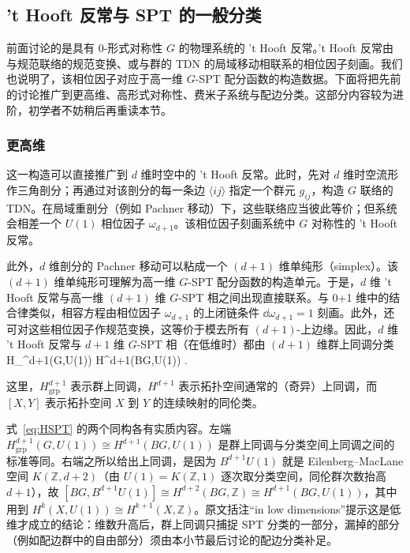 
\subsection{'t Hooft 反常与 SPT 的一般分类}\label{sec:gen-SPT}

前面讨论的是具有 0-形式对称性 $G$ 的物理系统的 't Hooft 反常。't Hooft 反常由与规范联络的规范变换、或与群的 TDN 的局域移动相联系的相位因子刻画。我们也说明了，该相位因子对应于高一维 $G$-SPT 配分函数的构造数据。下面将把先前的讨论推广到更高维、高形式对称性、费米子系统与配边分类。这部分内容较为进阶，初学者不妨稍后再重读本节。

\subsubsection{更高维}

这一构造可以直接推广到 $d$ 维时空中的 't Hooft 反常。此时，先对 $d$ 维时空流形作三角剖分；再通过对该剖分的每一条边 $\langle ij \rangle$ 指定一个群元 $g_{ij}$，构造 $G$ 联络的 TDN。在局域重剖分（例如 Pachner 移动）下，这些联络应当彼此等价；但系统会相差一个 $U(1)$ 相位因子 $\omega_{d+1}$。该相位因子刻画系统中 $G$ 对称性的 't Hooft 反常。

此外，$d$ 维剖分的 Pachner 移动可以粘成一个 $(d+1)$ 维单纯形（simplex）。该 $(d+1)$ 维单纯形可理解为高一维 $G$-SPT 配分函数的构造单元。于是，$d$ 维 't Hooft 反常与高一维 $(d+1)$ 维 $G$-SPT 相之间出现直接联系。与 0+1 维中的结合律类似，相容方程由相位因子 $\omega_{d+1}$ 的上闭链条件 $\dd \omega_{d+1}=1$ 刻画。此外，还可对这些相位因子作规范变换，这等价于模去所有 $(d+1)$-上边缘。因此，$d$ 维 't Hooft 反常与 $d+1$ 维 $G$-SPT 相（在低维时）都由 $(d+1)$ 维群上同调分类~\cite{chen2012symmetry,chen2013symmetry}
\be\label{eq:HSPT}
H_{}^{d+1}(G,U(1)) \cong H^{d+1}(BG,U(1)) \cong [BG,B^{d+1}U(1)].
\ee

这里，$H_{\mathrm{grp}}^{d+1}$ 表示群上同调，$H^{d+1}$ 表示拓扑空间通常的（奇异）上同调，而 $[X,Y]$ 表示拓扑空间 $X$ 到 $Y$ 的连续映射的同伦类。

\begin{yizhu}式~\eqref{eq:HSPT} 的两个同构各有实质内容。左端 $H^{d+1}_{\mathrm{grp}}(G,U(1))\cong H^{d+1}(BG,U(1))$ 是群上同调与分类空间上同调之间的标准等同。右端之所以给出上同调，是因为 $B^{d+1}U(1)$ 就是 Eilenberg--MacLane 空间 $K(\mathbb{Z},d+2)$（由 $U(1)=K(\mathbb{Z},1)$ 逐次取分类空间，同伦群次数抬高 $d+1$），故 $[BG,B^{d+1}U(1)]\cong H^{d+2}(BG,\mathbb{Z})\cong H^{d+1}(BG,U(1))$，其中用到 $H^{k}(X,U(1))\cong H^{k+1}(X,\mathbb{Z})$。原文括注“in low dimensions”提示这是低维才成立的结论：维数升高后，群上同调只捕捉 SPT 分类的一部分，漏掉的部分（例如配边群中的自由部分）须由本小节最后讨论的配边分类补足。\end{yizhu}

